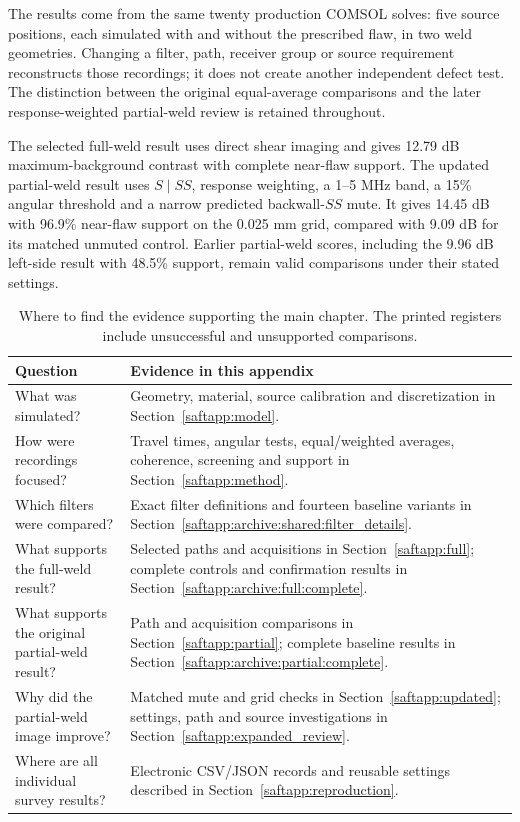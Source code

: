 The results come from the same twenty production COMSOL solves: five source positions, each simulated with and without the prescribed flaw, in two weld geometries. Changing a filter, path, receiver group or source requirement reconstructs those recordings; it does not create another independent defect test. The distinction between the original equal-average comparisons and the later response-weighted partial-weld review is retained throughout.

The selected full-weld result uses direct shear imaging and gives 12.79 dB maximum-background contrast with complete near-flaw support. The updated partial-weld result uses $S\mid SS$, response weighting, a 1--5 MHz band, a 15\% angular threshold and a narrow predicted backwall-$SS$ mute. It gives 14.45 dB with 96.9\% near-flaw support on the 0.025 mm grid, compared with 9.09 dB for its matched unmuted control. Earlier partial-weld scores, including the 9.96 dB left-side result with 48.5\% support, remain valid comparisons under their stated settings.

\begin{table}[!htbp]\centering\small
\caption{Where to find the evidence supporting the main chapter. The printed registers include unsuccessful and unsupported comparisons.}
\begin{tabularx}{\linewidth}{@{}>{\raggedright\arraybackslash}X>{\raggedright\arraybackslash}X@{}}\toprule
Question & Evidence in this appendix\\\midrule
What was simulated? & Geometry, material, source calibration and discretization in Section~\ref{saftapp:model}.\\
How were recordings focused? & Travel times, angular tests, equal/weighted averages, coherence, screening and support in Section~\ref{saftapp:method}.\\
Which filters were compared? & Exact filter definitions and fourteen baseline variants in Section~\ref{saftapp:archive:shared:filter_details}.\\
What supports the full-weld result? & Selected paths and acquisitions in Section~\ref{saftapp:full}; complete controls and confirmation results in Section~\ref{saftapp:archive:full:complete}.\\
What supports the original partial-weld result? & Path and acquisition comparisons in Section~\ref{saftapp:partial}; complete baseline results in Section~\ref{saftapp:archive:partial:complete}.\\
Why did the partial-weld image improve? & Matched mute and grid checks in Section~\ref{saftapp:updated}; settings, path and source investigations in Section~\ref{saftapp:expanded_review}.\\
Where are all individual survey results? & Electronic CSV/JSON records and reusable settings described in Section~\ref{saftapp:reproduction}.\\
\bottomrule\end{tabularx}
\end{table}

